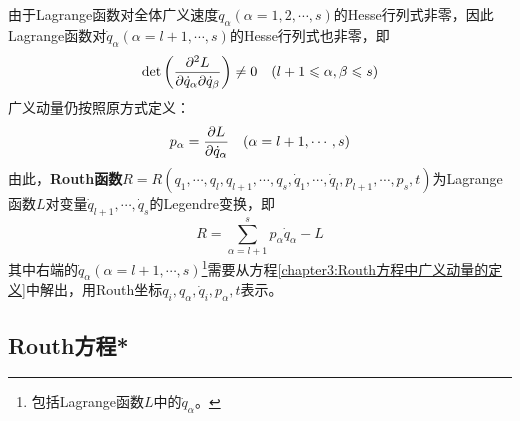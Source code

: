 由于Lagrange函数对全体广义速度$\dot{q}_\alpha(\alpha=1,2,\cdots,s)$的Hesse行列式非零，因此Lagrange函数对$\dot{q}_\alpha(\alpha=l+1,\cdots,s)$的Hesse行列式也非零，即
\begin{equation*}
	\det\begin{pmatrix} \dfrac{\partial^2L}{\partial \dot{q}_\alpha\partial \dot{q}_\beta}\end{pmatrix} \neq 0 \quad (l+1\leqslant \alpha,\beta\leqslant s)
\end{equation*}
广义动量仍按照原方式定义：
\begin{equation}
	p_\alpha=\frac{\partial L}{\partial \dot{q}_\alpha} \quad (\alpha=l+1,\cdots,s)
	\label{chapter3:Routh方程中广义动量的定义}
\end{equation}
由此，{\bf Routh函数}$R=R(q_1,\cdots,q_l,q_{l+1},\cdots,q_s,\dot{q}_1,\cdots,\dot{q}_l,p_{l+1},\cdots,p_s,t)$为Lagrange函数$L$对变量$\dot{q}_{l+1},\cdots,\dot{q}_s$的Legendre变换，即
\begin{equation}
	R = \sum_{\alpha=l+1}^sp_\alpha\dot{q}_\alpha-L
	\label{chapter3:Routh函数的定义}
\end{equation}
其中右端的$\dot{q}_\alpha(\alpha=l+1,\cdots,s)$\footnote{包括Lagrange函数$L$中的$\dot{q}_\alpha$。}需要从方程\eqref{chapter3:Routh方程中广义动量的定义}中解出，用Routh坐标$q_i,q_\alpha,\dot{q}_i,p_\alpha,t$表示。

\subsection{Routh方程*}

